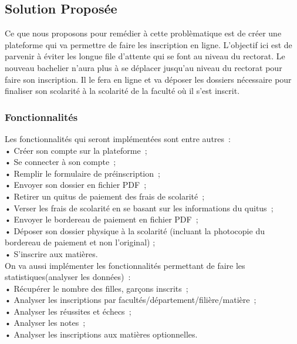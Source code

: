 \documentclass[12pt,a4paper]{article}
\begin{document}
	\subsection{Solution Proposée}
	Ce que nous proposons pour remédier à cette problèmatique est de créer une plateforme qui va permettre de faire les inscription en ligne. L’objectif ici est de parvenir à éviter les longue file d’attente qui se font au niveau du rectorat. Le nouveau bachelier n’aura plus à se déplacer jusqu’au niveau du rectorat pour faire son inscription. Il le fera en ligne et va déposer les dossiers nécessaire pour finaliser son scolarité à la scolarité de la faculté où il s’est inscrit.
	
	\subsubsection{Fonctionnalités}
	Les fonctionnalités qui seront implémentées sont entre autres : \\
	• Créer son compte sur la plateforme ;\\
	• Se connecter à son compte ;\\
	• Remplir le formulaire de préinscription ;\\
	• Envoyer son dossier en fichier PDF ;\\
	• Retirer un quitus de paiement des frais de scolarité ;\\
	• Verser les frais de scolarité en se basant sur les informations du quitus ;\\
	• Envoyer le bordereau de paiement en fichier PDF ;\\
	• Déposer son dossier physique à la scolarité (incluant la photocopie du bordereau de paiement et non l’original) ;\\
	• S’inscrire aux matières.\\
	
	On va aussi implémenter les fonctionnalités permettant de faire les statistiques(analyser les données) :\\
	• Récupérer le nombre des filles, garçons inscrits ;\\
	• Analyser les inscriptions par facultés/département/filière/matière ;\\
	• Analyser les réussites et échecs ;\\
	• Analyser les notes ;\\
	• Analyser les inscriptions aux matières optionnelles.\\
	
\end{document}
